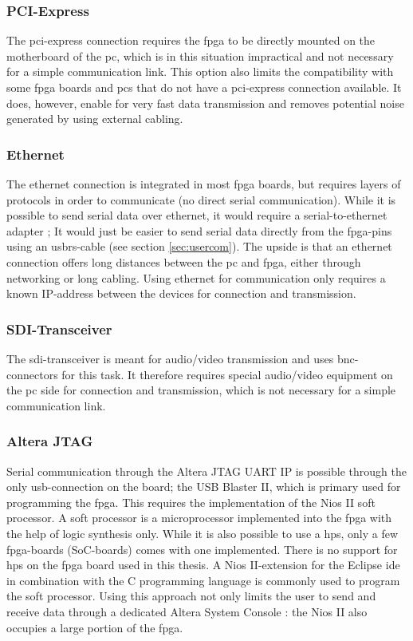 \documentclass[main.tex]{subfiles}
\begin{document}
\subsubsection{PCI-Express}
The \gls{pci}-express connection requires the \gls{fpga} to be directly mounted on the motherboard of the \acrshort{pc}, which is in this situation impractical and not necessary for a simple communication link. This option also limits the compatibility with some \gls{fpga} boards and \acrshort{pc}s that do not have a \gls{pci}-express connection available. It does, however, enable for very fast data transmission and removes potential noise generated by using external cabling. 

\subsubsection{Ethernet}
The ethernet connection is integrated in most \gls{fpga} boards, but requires layers of protocols in order to communicate (no direct serial communication). While it is possible to send serial data over ethernet, it would require a serial-to-ethernet adapter \cite{serial2ethernet}; It would just be easier to send serial data directly from the \gls{fpga}-pins using an \gls{usbrs}-cable (see section \ref{sec:usercom}). The upside is that an ethernet connection offers long distances between the \acrshort{pc} and \gls{fpga}, either through networking or long cabling. Using ethernet for communication only requires a known IP-address between the devices for connection and transmission.

\subsubsection{SDI-Transceiver}
The \acrshort{sdi}-transceiver is meant for audio/video transmission and uses \acrshort{bnc}-connectors for this task. It therefore requires special audio/video equipment on the \acrshort{pc} side for connection and transmission, which is not necessary for a simple communication link.

\subsubsection{Altera JTAG}
Serial communication through the Altera JTAG UART IP is possible through the only \acrshort{usb}-connection on the board; the USB Blaster II, which is primary used for programming the \gls{fpga}. This requires the implementation of the Nios II soft processor. A soft processor is a microprocessor implemented into the \gls{fpga} with the help of logic synthesis only. While it is also possible to use a \gls{hps}, only a few \gls{fpga}-boards (SoC-boards) comes with one implemented. There is no support for \gls{hps} on the \gls{fpga} board used in this thesis. A Nios II-extension for the Eclipse \acrshort{ide} in combination with the C programming language is commonly used to program the soft processor. Using this approach not only limits the user to send and receive data through a dedicated Altera System Console \cite{altera_terminals14}: the Nios II also occupies a large portion of the \gls{fpga}.
\end{document}
